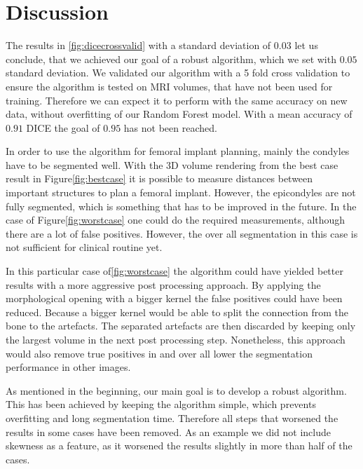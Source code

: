 \section{Discussion}
The results in \autoref{fig:dicecrossvalid} with a standard deviation of $0.03$ let us conclude, that we achieved our goal of a robust algorithm, which we set with $0.05$ standard deviation. We validated our algorithm with a 5 fold cross validation to ensure the algorithm is tested on MRI volumes, that have not been used for training. Therefore we can expect it to perform with the same accuracy on new data, without overfitting of our Random Forest model. With a mean accuracy of $0.91$ DICE the goal of $0.95$ has not been reached. 

In order to use the algorithm for femoral implant planning, mainly the condyles have to be segmented well. With the 3D volume rendering from the best case result in Figure\autoref{fig:bestcase} it is possible to measure distances between important structures to plan a femoral implant. However, the epicondyles are not fully segmented, which is something that has to be improved in the future. In the case of Figure\autoref{fig:worstcase} one could do the required measurements, although there are a lot of false positives. However, the over all segmentation in this case is not sufficient for clinical routine yet.

In this particular case of\autoref{fig:worstcase} the algorithm could have yielded better results with a more aggressive post processing approach. By applying the morphological opening with a bigger kernel the false positives could have been reduced. Because a bigger kernel would be able to split the connection from the bone to the artefacts. The separated artefacts are then discarded by keeping only the largest volume in the next post processing step. Nonetheless, this approach would also remove true positives in and over all lower the segmentation performance in other images. 

As mentioned in the beginning, our main goal is to develop a robust algorithm. This has been achieved by keeping the algorithm simple, which prevents overfitting and long segmentation time. Therefore all steps that worsened the results in some cases have been removed. As an example we did not include skewness as a feature, as it worsened the results slightly in more than half of the cases.
